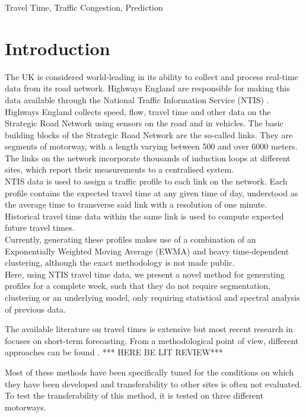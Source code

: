 \documentclass[conference, letterpaper]{IEEEtran}
\begin{document}
\begin{IEEEkeywords}
Travel Time, Traffic Congestion, Prediction
\end{IEEEkeywords}

\section{Introduction}
The UK is considered world-leading in its ability to collect and process real-time data from its road network. 
Highways England are responsible for making this data available through the National Traffic Information Service (NTIS) \cite{NTIS}. 
Highways England collects speed, flow, travel time and other data on the Strategic Road Network using sensors on the road and in vehicles. 
The basic building blocks of the Strategic Road Network are the so-called links. 
They are segments of motorway, with a length varying between 500 and over 6000 meters. 
The links on the network incorporate thousands of induction loops at different sites, which report their measurements to a centralised system.\\

NTIS data is used to assign a traffic profile to each link on the network. 
Each profile contains the expected travel time at any given time of day, understood as the average time to transverse said link with a resolution of one minute.
Historical travel time data within the same link is used to compute expected future travel times.\\

Currently, generating these profiles makes use of a combination of an Exponentially Weighted Moving Average (EWMA) and heavy time-dependent clustering, although the exact methodology is not made public. \\

Here, using NTIS travel time data, we present a novel method for generating profiles for a complete week, such that they do not require segmentation, clustering or an underlying model, only requiring statistical and spectral analysis of previous data.

The available literature on travel times is extensive but most recent research in focuses on short-term forecasting. From a methodological point of view, different approaches can be found .
*** HERE BE LIT REVIEW***

Most of these methods have been specifically tuned for the conditions on which they have been developed and transferability to other sites is often not evaluated.
To test the transferability of this method, it is tested on three different motorways.
\end{document}

